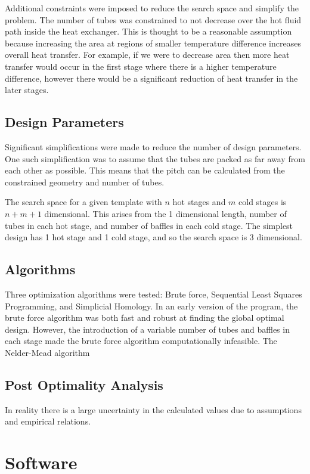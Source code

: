 \documentclass{article}
\begin{document}
Additional constraints were imposed to reduce the search space and simplify the problem.
The number of tubes was constrained to not decrease over the hot fluid path inside the heat exchanger.
This is thought to be a reasonable assumption because increasing the area at regions of smaller temperature difference increases overall heat transfer.
For example, if we were to decrease area then more heat transfer would occur in the first stage where there is a higher temperature difference, however there would be a significant reduction of heat transfer in the later stages.

\subsection{Design Parameters}

Significant simplifications were made to reduce the number of design parameters.
One such simplification was to assume that the tubes are packed as far away from each other as possible.
This means that the pitch can be calculated from the constrained geometry and number of tubes.

The search space for a given template with $n$ hot stages and $m$ cold stages is $n + m + 1$ dimensional.
This arises from the 1 dimensional length, number of tubes in each hot stage, and number of baffles in each cold stage.
The simplest design has 1 hot stage and 1 cold stage, and so the search space is 3 dimensional.

\subsection{Algorithms}
Three optimization algorithms were tested: Brute force, Sequential Least Squares Programming, and Simplicial Homology.
In an early version of the program, the brute force algorithm was both fast and robust at finding the global optimal design.
However, the introduction of a variable number of tubes and baffles in each stage made the brute force algorithm computationally infeasible.
The Nelder-Mead algorithm

\subsection{Post Optimality Analysis}

In reality there is a large uncertainty in the calculated values due to assumptions and empirical relations.


\section{Software}
\end{document}
